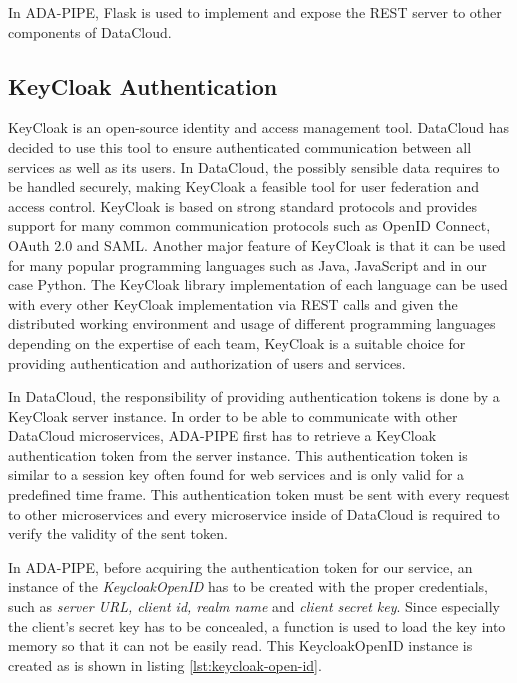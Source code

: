 \documentclass{article}
\begin{document}
            In ADA-PIPE, Flask is used to implement and expose the REST server to other components of DataCloud.

        \subsection{KeyCloak Authentication}

            KeyCloak is an open-source identity and access management tool.
            DataCloud has decided to use this tool to ensure authenticated communication between all services as well as its users.
            In DataCloud, the possibly sensible data requires to be handled securely, making KeyCloak a feasible tool for user federation and access control. KeyCloak is based on strong standard protocols and provides support for many common communication protocols such as OpenID Connect, OAuth 2.0 and SAML.
            Another major feature of KeyCloak is that it can be used for many popular programming languages such as Java, JavaScript and in our case Python. The KeyCloak library implementation of each language can be used with every other KeyCloak implementation via REST calls and given the distributed working environment and usage of different programming languages depending on the expertise of each team, KeyCloak is a suitable choice for providing authentication and authorization of users and services.

            In DataCloud, the responsibility of providing authentication tokens is done by a KeyCloak server instance.
            In order to be able to communicate with other DataCloud microservices, ADA-PIPE first has to retrieve a KeyCloak authentication token from the server instance. This authentication token is similar to a session key often found for web services and is only valid for a predefined time frame. This authentication token must be sent with every request to other microservices and every microservice inside of DataCloud is required to verify the validity of the sent token.

            In ADA-PIPE, before acquiring the authentication token for our service, an instance of the \emph{KeycloakOpenID} has to be created with the proper credentials, such as \emph{server URL, client id, realm name} and \emph{client secret key}. Since especially the client's secret key has to be concealed, a function is used to load the key into memory so that it can not be easily read. This KeycloakOpenID instance is created as is shown in listing \ref{lst:keycloak-open-id}.
            
\end{document}
